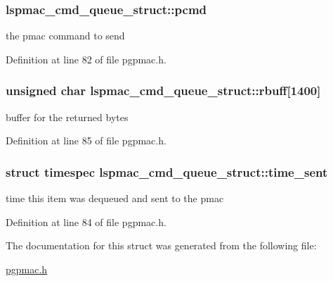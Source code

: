 \hypertarget{structlspmac__cmd__queue__struct_a9ac7618bbe0faa3001e8efeb1d89010d}{
\subsubsection[{pcmd}]{ lspmac\-\_\-cmd\-\_\-queue\-\_\-struct\-::pcmd}}\label{structlspmac__cmd__queue__struct_a9ac7618bbe0faa3001e8efeb1d89010d}


the pmac command to send 



Definition at line 82 of file pgpmac.\-h.

\hypertarget{structlspmac__cmd__queue__struct_aa059563886db174f9bb4f7a14bc19bbe}{
\subsubsection[{rbuff}]{\setlength{\rightskip}{0pt plus 5cm}unsigned char lspmac\-\_\-cmd\-\_\-queue\-\_\-struct\-::rbuff\mbox{[}1400\mbox{]}}}\label{structlspmac__cmd__queue__struct_aa059563886db174f9bb4f7a14bc19bbe}


buffer for the returned bytes 



Definition at line 85 of file pgpmac.\-h.

\hypertarget{structlspmac__cmd__queue__struct_a276ebc4b35c2554e4cb7377b60fd89b7}{
\subsubsection[{time\-\_\-sent}]{\setlength{\rightskip}{0pt plus 5cm}struct timespec lspmac\-\_\-cmd\-\_\-queue\-\_\-struct\-::time\-\_\-sent}}\label{structlspmac__cmd__queue__struct_a276ebc4b35c2554e4cb7377b60fd89b7}


time this item was dequeued and sent to the pmac 



Definition at line 84 of file pgpmac.\-h.



The documentation for this struct was generated from the following file\-:\begin{DoxyCompactItemize}
\item 
\hyperlink{pgpmac_8h}{pgpmac.\-h}\end{DoxyCompactItemize}
